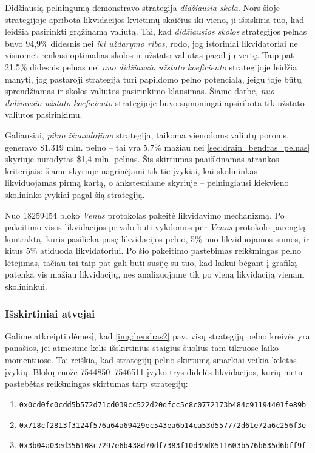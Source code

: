 \documentclass[]{VUMIFTemplateClass}
\begin{document}
Didžiausią pelningumą demonstravo strategija \textit{didžiausia skola}. Nors šioje strategijoje apribota likvidacijos kvietimų skaičius iki vieno, ji išsiskiria tuo, kad leidžia pasirinkti grąžinamą valiutą. Tai, kad \textit{didžiausios skolos} strategijos pelnas buvo 94,9\% didesnis nei \textit{iki uždarymo ribos}, rodo, jog istoriniai likvidatoriai ne visuomet renkasi optimalias skolos ir užstato valiutas pagal jų vertę. Taip pat 21,5\% didesnis pelnas nei \textit{nuo didžiausio užstato koeficiento} strategijoje leidžia manyti, jog pastaroji strategija turi papildomo pelno potencialą, jeigu joje būtų sprendžiamas ir skolos valiutos pasirinkimo klausimas. Šiame darbe, \textit{nuo didžiausio užstato koeficiento} strategijoje buvo sąmoningai apsiribota tik užstato valiutos pasirinkimu.

Galiausiai, \textit{pilno išnaudojimo} strategija, taikoma vienodoms valiutų poroms, generavo \$1,319 mln. pelno – tai yra 5,7\% mažiau nei \ref{sec:drain_bendras_pelnas} skyriuje nurodytas \$1,4 mln. pelnas. Šis skirtumas paaiškinamas atrankos kriterijais: šiame skyriuje nagrinėjami tik tie įvykiai, kai skolininkas likviduojamas pirmą kartą, o ankstesniame skyriuje – pelningiausi kiekvieno skolininko įvykiai pagal šią strategiją.

Nuo 18259454 \cite{LikvidacijosKontraktas} bloko \textit{Venus} protokolas pakeitė likvidavimo mechanizmą. Po pakeitimo visos likvidacijos privalo būti vykdomos per \textit{Venus} protokolo parengtą kontraktą, kuris pasilieka pusę likvidacijos pelno, 5\% nuo likviduojamos sumos, ir kitus 5\% atiduoda likvidatoriui. Po šio pakeitimo pastebimas reikšmingas pelno lėtėjimas, tačiau tai taip pat gali būti susiję su tuo, kad laikui bėgant į grafiką patenka vis mažiau likvidacijų, nes analizuojame tik po vieną likvidaciją vienam skolininkui.

\subsubsection{Išskirtiniai atvejai}
\label{sec:isskirtiniai_atvejai}
Galime atkreipti dėmesį, kad \ref{img:bendras2} pav. visų strategijų pelno kreivės yra panašios, jei atmesime kelis išskirtinius staigius šuolius tam tikruose laiko momentuose. Tai reiškia, kad strategijų pelno skirtumą smarkiai veikia keletas įvykių. Blokų ruože 7544850–7546511 įvyko trys didelės likvidacijos, kurių metu pastebėtas reikšmingas skirtumas tarp strategijų:

\begin{enumerate}[label=\textbf{\Alph*.}]
    \item \texttt{0x0cd0fc0cdd5b572d71cd039cc522d20dfcc5c8c0772173b484c91194401fe89b}
    \item \texttt{0x718cf2813f3124f576a64a69429ec543ea6b14ca53d557772d61e72a6c256f3e}
    \item \texttt{0x3b04a03ed356108c7297e6b438d70df7383f10d39d0511603b576b635d6bff9f}
\end{enumerate}
\end{document}
